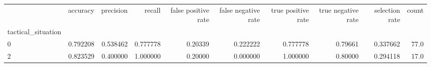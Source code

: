 \begin{tabular}{lrrrrrrrrr}
\toprule
{} &  accuracy &  precision &    recall &  false positive rate &  false negative rate &  true positive rate &  true negative rate &  selection rate &  count \\
tactical\_situation &           &            &           &                      &                      &                     &                     &                 &        \\
\midrule
0                  &  0.792208 &   0.538462 &  0.777778 &              0.20339 &             0.222222 &            0.777778 &             0.79661 &        0.337662 &   77.0 \\
2                  &  0.823529 &   0.400000 &  1.000000 &              0.20000 &             0.000000 &            1.000000 &             0.80000 &        0.294118 &   17.0 \\
\bottomrule
\end{tabular}
